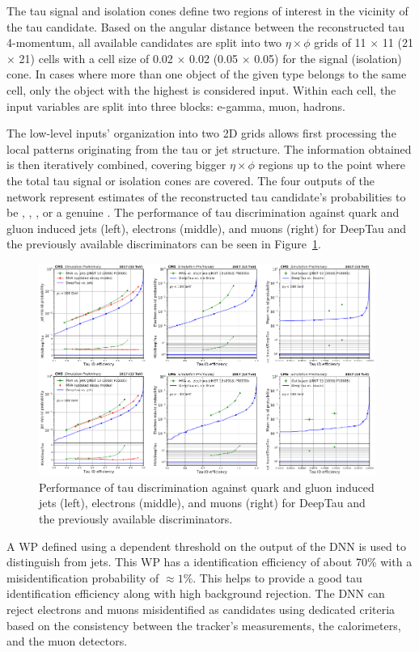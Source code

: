 The tau signal and isolation cones define two regions of interest in the vicinity of the tau candidate. Based on the angular distance between the reconstructed tau 4-momentum, all available candidates are split into two $\eta \times \phi$ grids of 11 $\times$ 11 (21 $\times$ 21) cells with a cell size of 0.02 $\times$ 0.02 (0.05 $\times$ 0.05) for the signal (isolation) cone. In cases where more than one object of the given type belongs to the same cell, only the object with the highest \pt is considered input. Within each cell, the input variables are split into three blocks: e-gamma, muon, hadrons.

The low-level inputs' organization into two 2D grids allows first processing the local patterns originating from the tau or jet structure. The information obtained is then iteratively combined, covering bigger $\eta \times \phi$ regions up to the point where the total tau signal or isolation cones are covered. The four outputs of the network represent estimates of the reconstructed tau candidate's probabilities to be \taue, \taum, \tauj, or a genuine \tauh. The performance of tau discrimination against quark and gluon induced jets (left), electrons (middle), and muons (right) for DeepTau and the previously available discriminators can be seen in Figure~\ref{fig:deeptau}.

\begin{figure}[hbtp]
  \centering
  \includegraphics[width=0.98\textwidth]{plots/chapter5/deeptau.png}
  \caption{Performance of tau discrimination against quark and gluon induced jets (left), electrons (middle), and muons (right) for DeepTau and the previously available discriminators.}
  \label{fig:deeptau}
\end{figure}

A WP defined using a \pt dependent threshold on the output of the DNN is used to distinguish \tauh from jets. This WP has a \tauh identification efficiency of about 70\% with a misidentification probability of $\approx 1\%$. This helps to provide a good tau identification efficiency along with high background rejection. The DNN can reject electrons and muons misidentified as \tauh candidates using dedicated criteria based on the consistency between the tracker's measurements, the calorimeters, and the muon detectors.

